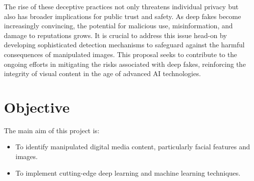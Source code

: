         The rise of these deceptive practices not only threatens individual privacy but also has broader implications for public trust and safety. As deep fakes become increasingly convincing, the potential for malicious use, misinformation, and damage to reputations grows. It is crucial to address this issue head-on by developing sophisticated detection mechanisms to safeguard against the harmful consequences of manipulated images. This proposal seeks to contribute to the ongoing efforts in mitigating the risks associated with deep fakes, reinforcing the integrity of visual content in the age of advanced AI technologies.
       \section{Objective}
            The main aim of this project is:
            \begin{itemize}
                \item To identify manipulated digital media content, particularly facial features and images.
                \item To implement cutting-edge deep learning and machine learning techniques.
            \end{itemize}